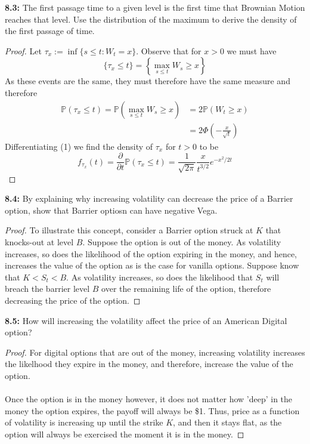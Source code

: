 \begin{tcolorbox}[colframe=black,colback=gray!5,boxrule=0.5pt]
\textbf{8.3:} The first passage time to a given level is the first time that Brownian Motion reaches that level. Use the distribution of the maximum to derive the density of the first passage of time. 
\end{tcolorbox}
\begin{proof}
    Let $\tau_x := \inf \{s\leq t: W_t = x\}$. Observe that for $x > 0$ we must have 
    $$\{\tau_x\leq t\} = \left\{\max_{s\leq t}W_s\geq x\right\}$$
    As these events are the same, they must therefore have the same measure and therefore
    \begin{align*}
        \mathbb{P}(\tau_x\leq t) = \mathbb{P}\left(\max_{s\le t} W_s\geq x\right) &= 2\mathbb{P}(W_t\geq x) \tag{Reflection Principal} \\
        &= 2\Phi\left(-\frac{x}{\sqrt{t}}\right) \tag{1}
    \end{align*}
    Differentiating (1) we find the density of $\tau_x$ for $t>0$ to be
    $$f_{\tau_x}(t) = \frac{\partial}{\partial t} \mathbb{P}(\tau_x\leq t) = \frac{1}{\sqrt{2\pi}}\frac{x}{t^{3/2}}e^{-x^2/2t}$$
\end{proof}




\begin{tcolorbox}[colframe=black,colback=gray!5,boxrule=0.5pt]
\textbf{8.4:} By explaining why increasing volatility can decrease the price of a Barrier option, show that Barrier optiosn can have negative Vega.
\end{tcolorbox}
\begin{proof}
    To illustrate this concept, consider a Barrier option struck at $K$ that knocks-out at level $B$. Suppose the option is out of the money. As volatility increases, so does the likelihood of the option expiring in the money, and hence, increases the value of the option as is the case for vanilla options. Suppose know that $K < S_t < B$. As volatility increases, so does the likelihood that $S_t$ will breach the barrier level $B$ over the remaining life of the option, therefore decreasing the price of the option.
\end{proof}

\begin{tcolorbox}[colframe=black,colback=gray!5,boxrule=0.5pt]
\textbf{8.5:} How will increasing the volatility affect the price of an American Digital option?
\end{tcolorbox}
\begin{proof}
    For digital options that are out of the money, increasing volatility increases the likelhood they expire in the money, and therefore, increase the value of the option. \\
    \\
    Once the option is in the money however, it does not matter how 'deep' in the money the option expires, the payoff will always be \$1. Thus, price as a function of volatility is increasing up until the strike $K$, and then it stays flat, as the option will always be exercised the moment it is in the money.
\end{proof}


